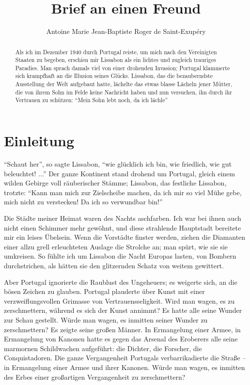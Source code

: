 \documentclass[12pt,ngerman,twocolumn]{article}
\author{Antoine Marie Jean-Baptiste Roger de Saint-Exupéry}
\title{Brief an einen Freund}
\begin{document}
\maketitle

{\onecolumn
\begin{abstract}
Als ich im Dezember 1940 durch Portugal reiste, um mich nach den Vereinigten Staaten zu begeben, erschien mir Lissabon als ein lichtes und zugleich trauriges Paradies. Man sprach damals viel von einer drohenden Invasion; Portugal klammerte sich krampfhaft an die Illusion seines Glücks. Lissabon, das die bezauberndste Ausstellung der Welt aufgebaut hatte, lächelte das etwas blasse Lächeln jener Mütter, die von ihrem Sohn im Felde keine Nachricht haben und nun versuchen, ihn durch ihr Vertrauen zu schützen: \enquote{Mein Sohn lebt noch, da ich lächle}
\end{abstract}
}\twocolumn

\section{Einleitung}

\enquote{Schaut her}, so sagte Lissabon, \enquote{wie glücklich ich bin, wie friedlich, wie gut beleuchtet! ...} Der ganze Kontinent stand drohend um Portugal, gleich einem wilden Gebirge voll räuberischer Stämme; Lissabon, das festliche Lissabon, trotzte: \enquote{Kann man mich zur Zielscheibe machen, da ich mir so viel Mühe gebe, mich nicht zu verstecken! Da ich so verwundbar bin!}

Die Städte meiner Heimat waren des Nachts aschfarben. Ich war bei ihnen auch nicht einen Schimmer mehr gewöhnt, und diese strahlende Hauptstadt bereitete mir ein leises Übelsein. Wenn die Vorstädte finster werden, ziehen die Diamanten einer allzu grell erleuchteten Auslage die Strolche an; man spürt, wie sie sie umkreisen. So fühlte ich um Lissabon die Nacht Europas lasten, von Bombern durchstrichen, als hätten sie den glitzernden Schatz von weitem gewittert.

Aber Portugal ignorierte die Raublust des Ungeheuers; es weigerte sich, an die bösen Zeichen zu glauben. Portugal plauderte über Kunst mit einer verzweiflungsvollen Grimasse von Vertrauensseligkeit. Wird man wagen, es zu zerschmettern, während es sich der Kunst annimmt? Es hatte alle seine Wunder zur Schau gestellt. Würde man wagen, es inmitten seiner Wunder zu zerschmettern? Es zeigte seine großen Männer. In Ermangelung einer Armee, in Ermangelung von Kanonen hatte es gegen das Arsenal des Eroberers alle seine marmornen Schildwachen aufgeführt: die Dichter, die Forscher, die Conquistadoren. Die ganze Vergangenheit Portugals verbarrikadierte die Straße -- in Ermangelung einer Armee und ihrer Kanonen. Würde man wagen, es inmitten des Erbes einer großartigen Vergangenheit zu zerschmettern?
\end{document}
